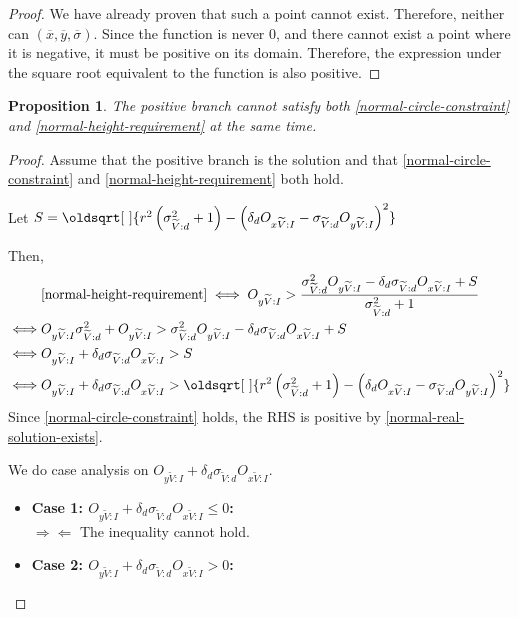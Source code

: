 \documentclass[a4paper,12pt]{article}
\newcommand{\contradiction}{\Rightarrow\!\Leftarrow}
\newcommand{\HSview}[1][V]{\widetilde{#1}}
\newcommand{\HSOx}[1][I]{O_{x\HSview:#1}}
\newcommand{\HSOy}[1][I]{O_{y\HSview:#1}}
\newcommand{\HSdelta}[1][d]{\delta_{#1}}
\newcommand{\HSsigma}[1][d]{\sigma_{\HSview:#1}}
\renewcommand*{\sqrt}[2][\ ]{\oldsqrt[#1]{#2} }
\newtheorem{proposition}[theorem]{Proposition}
\theoremstyle{definition}
\theoremstyle{plain}
\begin{document}
\begin{proof}
		We have already proven that such a point cannot exist. Therefore, neither can $\left(\overline{x}, \overline{y}, \overline{\sigma}\right)$.
		Since the function is never $0$, and there cannot exist a point where it is negative, it must be positive on its domain.
		Therefore, the expression under the square root equivalent to the function is also positive.
	\end{proof}

	\newpage
	
	\begin{proposition}
		The positive branch cannot satisfy both \eqref{normal-circle-constraint} and \eqref{normal-height-requirement} at the same time.
	\end{proposition}

	\begin{proof}
		Assume that the positive branch is the solution and that \eqref{normal-circle-constraint} and \eqref{normal-height-requirement} both hold.

		Let $S = \sqrt{r^2\left(\HSsigma^2 + 1\right) - \left(\HSdelta \HSOx - \HSsigma \HSOy\right)^2}$

		Then,
		\begin{align*}
			&\eqref{normal-height-requirement} \iff \HSOy > \frac{\HSsigma^2\HSOy - \HSdelta\HSsigma\HSOx + S}{\HSsigma^2 + 1}\\
			\iff& \HSOy\HSsigma^2 + \HSOy > \HSsigma^2\HSOy - \HSdelta\HSsigma\HSOx + S\\
			\iff& \HSOy + \HSdelta\HSsigma\HSOx > S\\
			\iff& \HSOy + \HSdelta\HSsigma\HSOx > \sqrt{r^2\left(\HSsigma^2 + 1\right) - \left(\HSdelta \HSOx - \HSsigma \HSOy\right)^2}
		\end{align*}
		Since \eqref{normal-circle-constraint} holds, the RHS is positive by \ref{normal-real-solution-exists}.

		We do case analysis on $\HSOy + \HSdelta\HSsigma\HSOx$.
		\begin{itemize}
			\item \textbf{Case 1: $\HSOy + \HSdelta\HSsigma\HSOx \le 0$:}\\

			$\contradiction$ The inequality cannot hold.
			\item \textbf{Case 2: $\HSOy + \HSdelta\HSsigma\HSOx > 0$:}\\


\end{itemize}
\end{proof}
\end{document}
